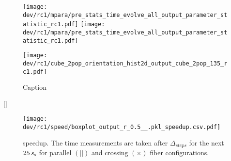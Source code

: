 %
\begin{sidewaysfigure}[]
\centering
\texttt{[image: dev/rc1/mpara/pre\_stats\_time\_evolve\_all\_output\_parameter\_statistic\_rc1.pdf]}
\texttt{[image: dev/rc1/mpara/pre\_stats\_time\_evolve\_all\_output\_parameter\_statistic\_rc1.pdf]}
\label{app:pste5}
\end{sidewaysfigure}
%
%
%
\begin{figure}
    \centering
    \texttt{[image: dev/rc1/cube\_2pop\_orientation\_hist2d\_output\_cube\_2pop\_135\_rc1.pdf]}
    \caption{Caption}
    \label{app:modelHistOrientation}
\end{figure}[]
%
%
\begin{figure}[!t]
\centering
\texttt{[image: dev/rc1/speed/boxplot\_output\_r\_0.5\_\_.pkl\_speedup.csv.pdf]}
\caption[ speedup]{ speedup. The time measurements are taken after $\Delta_{\mathit{steps}}$ for the next $\SI{25}{\textnormal{$\mathit{s_{s}}$}}$ for parallel $(||)$ and crossing $(\times)$ fiber configurations.}
\label{app:solverSpeedupAll}
\end{figure}
%
%
%
